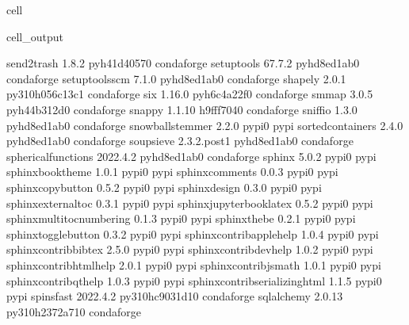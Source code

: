 \documentclass[letterpaper,table,10pt,english]{jupyterBook}
\begin{document}
\begin{sphinxuseclass}{cell}
\begin{sphinxVerbatimOutput}
\begin{sphinxuseclass}{cell_output}
\begin{sphinxVerbatim}[commandchars=\\\{\}]
send2trash                1.8.2              pyh41d4057\PYGZus{}0    conda\PYGZhy{}forge
setuptools                67.7.2             pyhd8ed1ab\PYGZus{}0    conda\PYGZhy{}forge
setuptools\PYGZhy{}scm            7.1.0              pyhd8ed1ab\PYGZus{}0    conda\PYGZhy{}forge
shapely                   2.0.1           py310h056c13c\PYGZus{}1    conda\PYGZhy{}forge
six                       1.16.0             pyh6c4a22f\PYGZus{}0    conda\PYGZhy{}forge
smmap                     3.0.5              pyh44b312d\PYGZus{}0    conda\PYGZhy{}forge
snappy                    1.1.10               h9fff704\PYGZus{}0    conda\PYGZhy{}forge
sniffio                   1.3.0              pyhd8ed1ab\PYGZus{}0    conda\PYGZhy{}forge
snowballstemmer           2.2.0                    pypi\PYGZus{}0    pypi
sortedcontainers          2.4.0              pyhd8ed1ab\PYGZus{}0    conda\PYGZhy{}forge
soupsieve                 2.3.2.post1        pyhd8ed1ab\PYGZus{}0    conda\PYGZhy{}forge
spherical\PYGZus{}functions       2022.4.2           pyhd8ed1ab\PYGZus{}0    conda\PYGZhy{}forge
sphinx                    5.0.2                    pypi\PYGZus{}0    pypi
sphinx\PYGZhy{}book\PYGZhy{}theme         1.0.1                    pypi\PYGZus{}0    pypi
sphinx\PYGZhy{}comments           0.0.3                    pypi\PYGZus{}0    pypi
sphinx\PYGZhy{}copybutton         0.5.2                    pypi\PYGZus{}0    pypi
sphinx\PYGZhy{}design             0.3.0                    pypi\PYGZus{}0    pypi
sphinx\PYGZhy{}external\PYGZhy{}toc       0.3.1                    pypi\PYGZus{}0    pypi
sphinx\PYGZhy{}jupyterbook\PYGZhy{}latex  0.5.2                    pypi\PYGZus{}0    pypi
sphinx\PYGZhy{}multitoc\PYGZhy{}numbering 0.1.3                    pypi\PYGZus{}0    pypi
sphinx\PYGZhy{}thebe              0.2.1                    pypi\PYGZus{}0    pypi
sphinx\PYGZhy{}togglebutton       0.3.2                    pypi\PYGZus{}0    pypi
sphinxcontrib\PYGZhy{}applehelp   1.0.4                    pypi\PYGZus{}0    pypi
sphinxcontrib\PYGZhy{}bibtex      2.5.0                    pypi\PYGZus{}0    pypi
sphinxcontrib\PYGZhy{}devhelp     1.0.2                    pypi\PYGZus{}0    pypi
sphinxcontrib\PYGZhy{}htmlhelp    2.0.1                    pypi\PYGZus{}0    pypi
sphinxcontrib\PYGZhy{}jsmath      1.0.1                    pypi\PYGZus{}0    pypi
sphinxcontrib\PYGZhy{}qthelp      1.0.3                    pypi\PYGZus{}0    pypi
sphinxcontrib\PYGZhy{}serializinghtml 1.1.5                    pypi\PYGZus{}0    pypi
spinsfast                 2022.4.2        py310hc9031d1\PYGZus{}0    conda\PYGZhy{}forge
sqlalchemy                2.0.13          py310h2372a71\PYGZus{}0    conda\PYGZhy{}forge

\end{sphinxVerbatim}
\end{sphinxuseclass}
\end{sphinxVerbatimOutput}
\end{sphinxuseclass}
\end{document}
